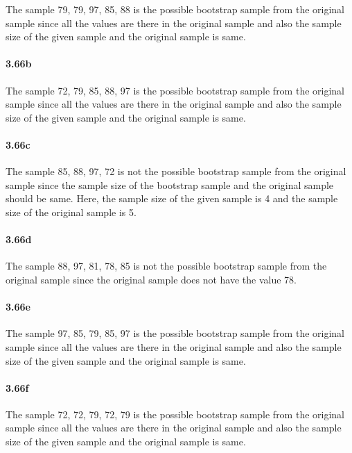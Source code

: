 \documentclass[
]{article}
\begin{document}
The sample 79, 79, 97, 85, 88 is the possible bootstrap sample from the
original sample since all the values are there in the original sample
and also the sample size of the given sample and the original sample is
same.

\hypertarget{b-8}{%
\paragraph{3.66b}\label{b-8}}

The sample 72, 79, 85, 88, 97 is the possible bootstrap sample from the
original sample since all the values are there in the original sample
and also the sample size of the given sample and the original sample is
same.

\hypertarget{c-6}{%
\paragraph{3.66c}\label{c-6}}

The sample 85, 88, 97, 72 is not the possible bootstrap sample from the
original sample since the sample size of the bootstrap sample and the
original sample should be same. Here, the sample size of the given
sample is 4 and the sample size of the original sample is 5.

\hypertarget{d-4}{%
\paragraph{3.66d}\label{d-4}}

The sample 88, 97, 81, 78, 85 is not the possible bootstrap sample from
the original sample since the original sample does not have the value
78.

\hypertarget{e-1}{%
\paragraph{3.66e}\label{e-1}}

The sample 97, 85, 79, 85, 97 is the possible bootstrap sample from the
original sample since all the values are there in the original sample
and also the sample size of the given sample and the original sample is
same.

\hypertarget{f-1}{%
\paragraph{3.66f}\label{f-1}}

The sample 72, 72, 79, 72, 79 is the possible bootstrap sample from the
original sample since all the values are there in the original sample
and also the sample size of the given sample and the original sample is
same.
\end{document}
